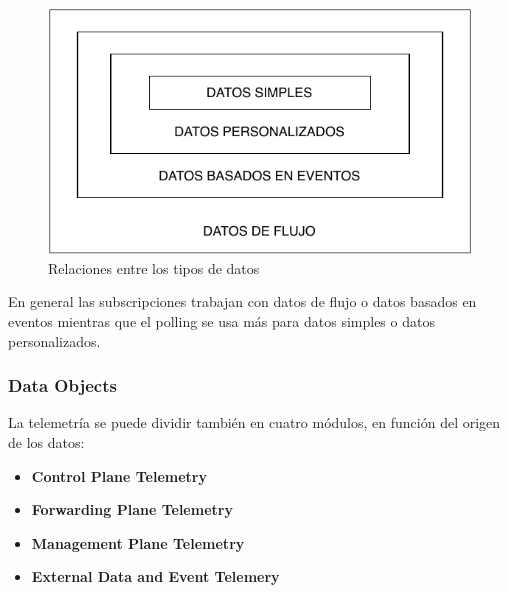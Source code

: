 \begin{figure}
    \centering
    \includegraphics[scale=.75]{graphics/tipos_de_datos_framework}
    \caption{Relaciones entre los tipos de datos}
    \label{fig:tipos_de_datos_framework}
\end{figure}

En general las subscripciones trabajan con datos de flujo o datos basados en eventos mientras que el polling se usa más para datos simples o datos personalizados.


\subsubsection{Data Objects}
La telemetría se puede dividir también en cuatro módulos, en función del origen de los datos:

\begin{itemize}
    \item \textbf{Control Plane Telemetry}
    \item \textbf{Forwarding Plane Telemetry}
    \item \textbf{Management Plane Telemetry}
    \item \textbf{External Data and Event Telemery}
\end{itemize}


